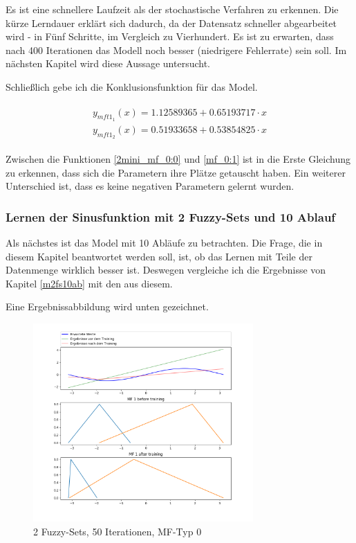 Es ist eine schnellere Laufzeit als der stochastische Verfahren zu erkennen. Die kürze Lerndauer erklärt sich dadurch, da der Datensatz schneller abgearbeitet wird - in Fünf Schritte, im Vergleich zu Vierhundert. Es ist zu erwarten, dass nach 400 Iterationen das Modell noch besser (niedrigere Fehlerrate) sein soll. Im nächsten Kapitel wird diese Aussage untersucht.

Schließlich gebe ich die Konklusionsfunktion für das Model.


\begin{align}
\begin{split}\label{2mini_mf_0:0}
y_{mft1_1}(x) = 1.12589365 + 0.65193717\cdot x \\
y_{mft1_2}(x) = 0.51933658 + 0.53854825\cdot x
\end{split}
\end{align}

Zwischen die Funktionen \ref{2mini_mf_0:0} und \ref{mf_0:1} ist in die Erste Gleichung zu erkennen, dass sich die Parametern ihre Plätze getauscht haben. Ein weiterer Unterschied ist, dass es keine negativen Parametern gelernt wurden.


\subsubsection{Lernen der Sinusfunktion mit 2 Fuzzy-Sets und 10 Ablauf}
Als nächstes ist das Model mit 10 Abläufe zu betrachten. Die Frage, die in diesem Kapitel beantwortet werden soll, ist, ob das Lernen mit Teile der Datenmenge wirklich besser ist. Deswegen vergleiche ich die Ergebnisse von Kapitel \ref{m2fs10ab} mit den aus diesem. 

Eine Ergebnissabbildung wird unten gezeichnet.

\begin{figure}[htbp]
	\centering
	\includegraphics[width=0.75\textwidth]{images/sinus/Mini-Batch/sinus 1 Input 2 Sets 50 Epochs Mini-Batch Gradient Descent two equations mf.png}
	\caption{2 Fuzzy-Sets, 50 Iterationen, MF-Typ 0}
	\label{2mini_batch50:0}
\end{figure}

